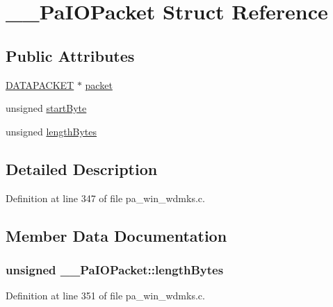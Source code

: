 \hypertarget{struct_____pa_i_o_packet}{}\section{\+\_\+\+\_\+\+Pa\+I\+O\+Packet Struct Reference}
\label{struct_____pa_i_o_packet}
\subsection*{Public Attributes}
\begin{DoxyCompactItemize}
\item 
\hyperlink{pa__win__wdmks_8c_a6d1fcd4c734c4938cadbb326520d2026}{D\+A\+T\+A\+P\+A\+C\+K\+ET} $\ast$ \hyperlink{struct_____pa_i_o_packet_af9b39c3b9381b31ad27daf1d9689e9ae}{packet}
\item 
unsigned \hyperlink{struct_____pa_i_o_packet_aac33f08703b3e5553760a3e1e0d68714}{start\+Byte}
\item 
unsigned \hyperlink{struct_____pa_i_o_packet_a7f5be19ae9613a09a9eff411cea344f2}{length\+Bytes}
\end{DoxyCompactItemize}


\subsection{Detailed Description}


Definition at line 347 of file pa\+\_\+win\+\_\+wdmks.\+c.



\subsection{Member Data Documentation}
\subsubsection[{\texorpdfstring{length\+Bytes}{lengthBytes}}]{\setlength{\rightskip}{0pt plus 5cm}unsigned \+\_\+\+\_\+\+Pa\+I\+O\+Packet\+::length\+Bytes}\hypertarget{struct_____pa_i_o_packet_a7f5be19ae9613a09a9eff411cea344f2}{}\label{struct_____pa_i_o_packet_a7f5be19ae9613a09a9eff411cea344f2}


Definition at line 351 of file pa\+\_\+win\+\_\+wdmks.\+c.

